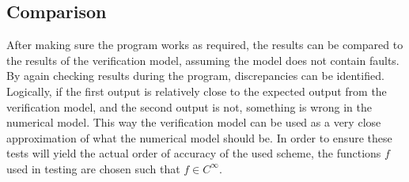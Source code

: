 \subsection{Comparison}
After making sure the program works as required, the results can be compared to the results of the verification model, assuming the model does not contain faults. By again checking results during the program, discrepancies can be identified. Logically, if the first output is relatively close to the expected output from the verification model, and the second output is not, something is wrong in the numerical model. This way the verification model can be used as a very close approximation of what the numerical model should be. In order to ensure these tests will yield the actual order of accuracy of the used scheme, the functions $f$ used in testing are chosen such that $f \in C^{\infty}$. 
